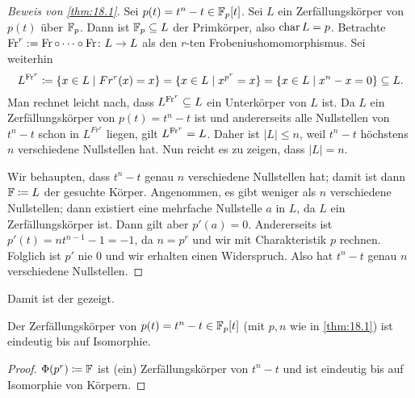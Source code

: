 \documentclass[12pt,a4paper]{scrartcl}
\begin{document}
\begin{proof}[Beweis von \cref{thm:18.1}]
	Sei $p(t) = t^n-t\in\mathbb F_p[t]$. Sei $L$ ein Zerfällungskörper von $p(t)$ über $\mathbb F_p$. Dann ist $\mathbb F_p\subseteq L$ der Primkörper, also $\operatorname{char} L = p$. Betrachte $\operatorname{Fr}^r : = \operatorname{Fr}\circ\dots\circ \operatorname{Fr}\colon L\to L$ als den $r$-ten Frobeniushomomorphismus. Sei weiterhin
	\[L^{\operatorname{Fr}^r} \coloneqq \{x\in L\mid Fr^r(x) = x\} = \{x\in L\mid x^{p^r} = x\} = \{x\in L\mid x^n -x = 0\}\subseteq L.\]
	Man rechnet leicht nach, dass $L^{\operatorname{Fr}^r}\subseteq L$ ein Unterkörper von $L$ ist. Da $L$ ein Zerfällungskörper von $p(t ) = t^n-t$ ist und andererseits alle Nullstellen von $t^n-t$ schon in $L^{Fr^r}$ liegen, gilt $L^{\operatorname{Fr}^r} = L$. Daher ist $|L|\leq n$, weil $t^n-t$ höchstens $n$ verschiedene Nullstellen hat. Nun reicht es zu zeigen, dass $|L| = n$.
	
	Wir behaupten, dass $t^n-t$ genau $n$ verschiedene Nullstellen hat; damit ist dann $\mathbb F \coloneqq L$ der gesuchte Körper. Angenommen, es gibt weniger als $n$ verschiedene Nullstellen; dann existiert eine mehrfache Nullstelle $a$ in $L$, da $L$ ein Zerfällungskörper ist. Dann gilt aber $p'(a) = 0$. Andererseits ist $p'(t) = nt^{n-1}-1 = -1$, da $n = p^r$ und wir mit Charakteristik $p$ rechnen. Folglich ist $p'$ nie $0$ und wir erhalten einen Widerspruch. Also hat $t^n-t$ genau $n$ verschiedene Nullstellen.	
\end{proof}

Damit ist der  gezeigt.

\begin{kor}
	Der Zerfällungskörper von $p(t) = t^n-t\in\mathbb F_p[t]$ \textup(mit $p,n$ wie in \cref{thm:18.1}\textup) ist eindeutig bis auf Isomorphie.
\end{kor}
\begin{proof}
	$\Phi(p^r) \coloneqq \mathbb F$ ist (ein) Zerfällungskörper von $t^n-t$ und ist eindeutig bis auf Isomorphie von Körpern.
\end{proof}	
\end{document}

